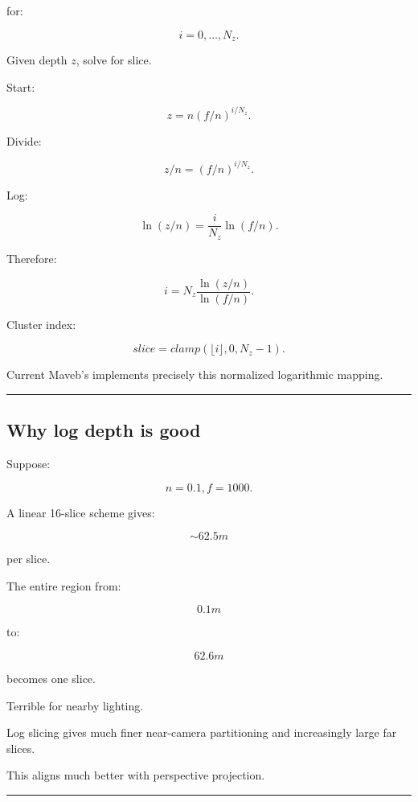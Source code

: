 for:

\[
i=0,\dots,N_z.
\]

Given depth \(z\), solve for slice.

Start:

\[
z=
n(f/n)^{i/N_z}.
\]

Divide:

\[
z/n=
(f/n)^{i/N_z}.
\]

Log:

\[
\ln(z/n)
=
\frac i{N_z}
\ln(f/n).
\]

Therefore:

\[
\boxed{
i
=
N_z
\frac{
\ln(z/n)
}{
\ln(f/n)
}.
}
\]

Cluster index:

\[
slice=
clamp(
\lfloor i\rfloor,
0,
N_z-1
).
\]

Current Maveb's  implements precisely this normalized logarithmic mapping.

\begin{center}\rule{0.5\linewidth}{0.5pt}\end{center}

\subsection{Why log depth is good}\label{04-visual-computing-ii-ch040-why-log-depth-is-good}

\hypertarget{04-visual-computing-ii-ch040-why-log-depth-is-good}{}

Suppose:

\[
n=0.1,
f=1000.
\]

A linear 16-slice scheme gives:

\[
\sim62.5m
\]

per slice.

The entire region from:

\[
0.1m
\]

to:

\[
62.6m
\]

becomes one slice.

Terrible for nearby lighting.

Log slicing gives much finer near-camera partitioning and increasingly large far slices.

This aligns much better with perspective projection.

\begin{center}\rule{0.5\linewidth}{0.5pt}\end{center}

